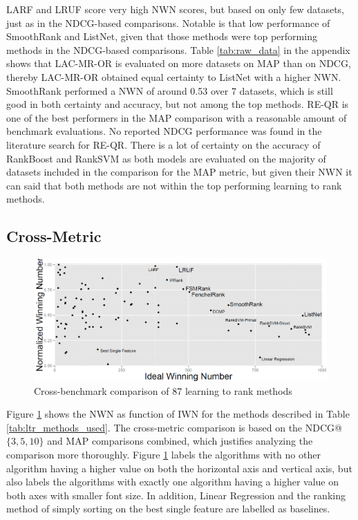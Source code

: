 \documentclass{sig-alternate}
\begin{document}
LARF and LRUF score very high NWN scores, but based on only few datasets, just as in the NDCG-based comparisons. Notable is that low performance of SmoothRank and ListNet, given that those methods were top performing methods in the NDCG-based comparisons. Table \ref{tab:raw_data} in the appendix shows that LAC-MR-OR is evaluated on more datasets on MAP than on NDCG, thereby LAC-MR-OR obtained equal certainty to ListNet with a higher NWN. SmoothRank performed a NWN of around 0.53 over 7 datasets, which is still good in both certainty and accuracy, but not among the top methods. RE-QR is one of the best performers in the MAP comparison with a reasonable amount of benchmark evaluations. No reported NDCG performance was found in the literature search for RE-QR. There is a lot of certainty on the accuracy of RankBoost and RankSVM as both models are evaluated on the majority of datasets included in the comparison for the MAP metric, but given their NWN it can said that both methods are not within the top performing learning to rank methods.

\subsection{Cross-Metric}
\begin{figure}
\centering
\includegraphics[scale=0.21]{gfx/combined_normalized_winnum}
\caption{Cross-benchmark comparison of 87 learning to rank methods}
\label{fig:normalized_winning_number_all}
\end{figure}
Figure \ref{fig:normalized_winning_number_all} shows the NWN as function of IWN for the methods described in Table \ref{tab:ltr_methods_used}. The cross-metric comparison is based on the NDCG@$\{3,5,10\}$ and MAP comparisons combined, which justifies analyzing the comparison more thoroughly. Figure \ref{fig:normalized_winning_number_all} labels the algorithms with no other algorithm having a higher value on both the horizontal axis and vertical axis, but also labels the algorithms with exactly one algorithm having a higher value on both axes with smaller font size. In addition, Linear Regression and the ranking method of simply sorting on the best single feature are labelled as baselines.\\
\end{document}
